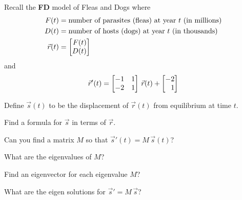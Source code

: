\documentclass{workbook}
\begin{document}
\begin{slide}
	\question
 		Recall the \textbf{FD} model of Fleas and Dogs where 
	\begin{align*}
		F(t) &= \text{number of parasites (fleas) at year $t$ (in millions)}\\
		D(t) &= \text{number of hosts (dogs) at year $t$ (in thousands)}\\
		\vec r(t) &= \mat{F(t)\\D(t)}
	\end{align*}
	and
	\[
		\vec r'(t) = \mat{-1&1\\-2&1}\,\vec r(t) + \mat{-2\\1}
	\]
	
	Define $\vec s(t)$ to be the displacement of $\vec r(t)$ from equilibrium at time $t$.
	\begin{parts}
		\item Find a formula for $\vec s$ in terms of $\vec r$.
		\item Can you find a matrix $M$ so that $\vec s'(t) = M\,\vec s(t)$?
		\item What are the eigenvalues of $M$?
		\item Find an eigenvector for each eigenvalue $M$?
		\item What are the eigen solutions for $\vec s'=M\,\vec s$?
	\end{parts}
\end{slide}
\end{document}
